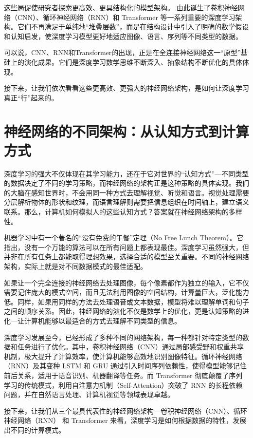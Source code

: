 这些局促使研究者探索更高效、更具结构化的模型架构。 由此诞生了卷积神经网络（CNN）、循环神经网络（RNN）和 Transformer 等一系列重要的深度学习架构。它们不再满足于单纯地“堆叠层数”，而是在结构设计中引入了明确的数学假设和认知启发，使深度学习模型更好地适应图像、语言、序列等不同类型的数据。

可以说，CNN、RNN和Transformer的出现，正是在全连接神经网络这一“原型”基础上的演化成果。它们是深度学习数学思维不断深入、抽象结构不断优化的具体体现。

接下来，让我们依次看看这些更高效、更强大的神经网络架构，是如何让深度学习真正“行”起来的。

\section{神经网络的不同架构：从认知方式到计算方式}

深度学习的强大不仅体现在其学习能力，还在于它对世界的“认知方式”---不同类型的数据决定了不同的学习策略，而神经网络的架构正是这种策略的具体实现。我们的大脑在感知世界时，不会用同一种方式去理解视觉、听觉和语言。视觉处理需要分层解析物体的形状和纹理，而语言理解则需要把信息组织在时间轴上，建立语义联系。那么，计算机如何模拟人的这些认知方式？答案就在神经网络架构的多样性。

机器学习中有一个著名的“没有免费的午餐”定理（No Free Lunch Theorem）。它指出，没有一个万能的算法可以在所有问题上都表现最佳。深度学习虽然强大，但并非在所有任务上都能取得理想效果，选择合适的模型至关重要。不同的神经网络架构，实际上就是对不同数据模式的最佳适配。

如果让一个完全连接的神经网络去处理图像，每个像素都作为独立的输入，它不仅需要记住庞大的模式空间，而且无法利用图像的空间结构，计算量巨大，泛化能力低。同样，如果用同样的方法去处理语音或文本数据，模型将难以理解单词和句子之间的顺序关系。因此，神经网络的演化不仅是数学上的优化，更是认知策略的进化---让计算机能够以最适合的方式去理解不同类型的信息。

深度学习发展至今，已经形成了多种不同的网络架构，每一种都针对特定类型的数据和任务进行了优化。其中，卷积神经网络（CNN）通过局部感受野和权重共享机制，极大提升了计算效率，使计算机能够高效地识别图像特征。循环神经网络（RNN）及其变种 LSTM 和 GRU 通过引入时间序列依赖性，使得模型能够记住前后关系，适用于语音识别、机器翻译等任务。而 Transformer 彻底颠覆了序列学习的传统模式，利用自注意力机制（Self-Attention）突破了 RNN 的长程依赖问题，并在自然语言处理、计算机视觉等领域表现卓越。

接下来，让我们从三个最具代表性的神经网络架构---卷积神经网络（CNN）、循环神经网络（RNN） 和 Transformer 来看，深度学习是如何根据数据的特性，发展出不同的计算模式。

